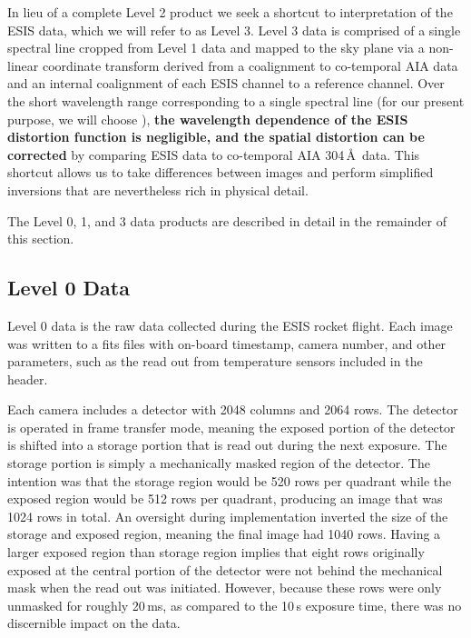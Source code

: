 \documentclass[linenumbers,trackchanges]{aastex63}
\begin{document}
In lieu of a complete Level 2 product we seek a shortcut to interpretation of the ESIS data, which  we will refer to as Level 3.
Level 3 data is comprised of a single spectral line cropped from Level 1 data and mapped to the sky plane via a non-linear coordinate transform derived from a coalignment to co-temporal AIA data and an internal coalignment of each ESIS channel to a reference channel. 
Over the short wavelength range corresponding to a single spectral line (for our present purpose, we will choose \ov), \textbf{the wavelength dependence of the ESIS distortion function is negligible, and the spatial distortion can be corrected} by comparing ESIS data to co-temporal AIA 304\,\AA\ data. 
This shortcut allows us to take differences between images and perform simplified inversions that are nevertheless rich in physical detail.



The Level 0, 1, and 3 data products are described in detail in the remainder of this section. 


    
\subsection{Level 0 Data}
    
Level 0 data is the raw data collected during the ESIS rocket flight.  
Each image was written to a fits files with on-board timestamp, camera number, and other parameters, such as the read out from temperature sensors included in the header.   

Each camera includes a detector with 2048 columns and 2064 rows.  The detector is operated in frame transfer mode, meaning the exposed portion of the detector is shifted into a storage portion that is read out during the next exposure. The storage portion is simply a mechanically masked region of the detector. The intention was that the storage region would be 520 rows per quadrant while the exposed region would be 512 rows per quadrant, producing an image that was 1024 rows in total.  An oversight during implementation inverted the size of the storage and exposed region, meaning the final image had 1040 rows.  Having a larger exposed region than storage region implies that eight rows originally exposed at the central portion of the detector were not behind the mechanical mask when the read out was initiated. However, because these rows were only unmasked for roughly 20\,ms, as compared to the 10\,s exposure time, there was no discernible impact on the data. 
\end{document}
